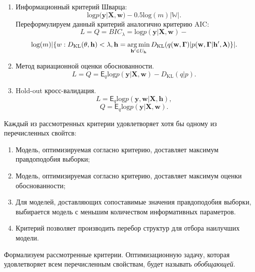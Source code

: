 \begin{enumerate}
\item Информационный критерий Шварца:
\[
    \text{log}p(\mathbf{y}|\mathbf{X}, \mathbf{w}) - 0.5\text{log}(m)|\mathbb{W}|.
\]
Переформулируем данный критерий аналогично критерию AIC:
\begin{equation}
\label{eq:optim_bic}
    L = Q = BIC_{\lambda} = \text{log}p(\mathbf{y}|\mathbf{X}, \mathbf{w}) -
\end{equation}
\[
 \text{log}(m)|\{w: D_\text{KL}(\theta, \mathbf{h})<\lambda, \mathbf{h} = \operatorname*{arg\,min}_{\mathbf{h}' \in U_\mathbf{h}} D_\text{KL}(q(\mathbf{w}, \boldsymbol{\Gamma}) | p(\mathbf{w}, \boldsymbol{\Gamma}|\mathbf{h}',\boldsymbol{\lambda})\}|.
\]


\item Метод вариационной оценки обоснованности.
\begin{equation}
\label{eq:optim_elbo_method}
    L = Q = \mathsf{E}_q \text{log}p(\mathbf{y}|\mathbf{X}, \mathbf{w}) - D_\text{KL}(q|p).
\end{equation}


\item Hold-out кросс-валидация.
\begin{equation}
\label{eq:optim_hold_out}
    L = \mathsf{E}_q \text{log}p(\mathbf{y}, \mathbf{w}|\mathbf{X}, \mathbf{h}),
\end{equation}
\[
    Q = \mathsf{E}_q \text{log}p(\mathbf{y}|\mathbf{X}, \mathbf{w}).
\]


\end{enumerate}

Каждый из рассмотренных критерии удовлетворяет хотя бы одному из перечисленных свойтсв:
\begin{enumerate}
\item Модель, оптимизируемая согласно критерию, доставляет максимум правдоподобия выборки;
\item Модель, оптимизируемая согласно критерию, доставляет максимум оценки обоснованности;
\item Для моделей, доставляющих сопоставимые значения правдоподобия выборки, выбирается модель с меньшим количеством информативных параметров.
\item Критерий позволяет производить перебор структур для отбора наилучших модели.
\end{enumerate}

Формализуем рассмотренные критерии. Оптимизационную задачу, которая удовлетворяет всем перечисленным свойствам, будет называть \textit{обобщающей}.

